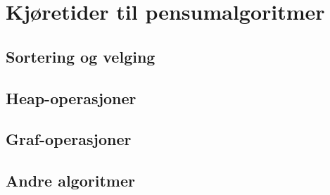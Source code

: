 \section{Kjøretider til pensumalgoritmer}
\subsection{Sortering og velging}
\subsection{Heap-operasjoner}
\subsection{Graf-operasjoner}
\subsection{Andre algoritmer}